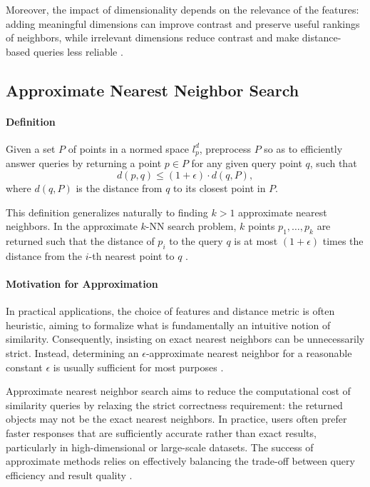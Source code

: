 Moreover, the impact of dimensionality depends on the relevance of the features: adding meaningful dimensions can improve contrast and preserve useful rankings of neighbors, while irrelevant dimensions reduce contrast and make distance-based queries less reliable \cite{Kouiroukidis-Evangelidis-2011}.

\subsection{Approximate Nearest Neighbor Search}

\paragraph{Definition}

Given a set $P$ of points in a normed space $l_p^d$, preprocess $P$ so as to efficiently answer queries by returning a point $p \in P$ for any given query point $q$, such that 
\[
d(p, q) \le (1 + \epsilon) \cdot d(q, P),
\]
where $d(q, P)$ is the distance from $q$ to its closest point in $P$.

This definition generalizes naturally to finding $k > 1$ approximate nearest neighbors. In the approximate $k$-NN search problem, $k$ points $p_1, \dots, p_k$ are returned such that the distance of $p_i$ to the query $q$ is at most $(1 + \epsilon)$ times the distance from the $i$-th nearest point to $q$ \cite{Gionis-Indyk-Motwani-1999}.

\paragraph{Motivation for Approximation}

In practical applications, the choice of features and distance metric is often heuristic, aiming to formalize what is fundamentally an intuitive notion of similarity. Consequently, insisting on exact nearest neighbors can be unnecessarily strict. Instead, determining an $\epsilon$-approximate nearest neighbor for a reasonable constant $\epsilon$ is usually sufficient for most purposes \cite{Indyk-Motwani-1998}.

Approximate nearest neighbor search aims to reduce the computational cost of similarity queries by relaxing the strict correctness requirement: the returned objects may not be the exact nearest neighbors. In practice, users often prefer faster responses that are sufficiently accurate rather than exact results, particularly in high-dimensional or large-scale datasets. The success of approximate methods relies on effectively balancing the trade-off between query efficiency and result quality \cite{Patella-Ciaccia-2009}.

